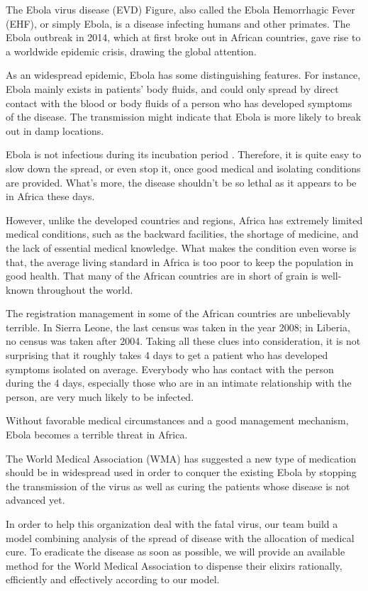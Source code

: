\documentclass[12pt]{article}
\begin{document}
The Ebola virus disease (EVD) Figure, also called the Ebola Hemorrhagic Fever (EHF), or simply Ebola, is a disease infecting humans and other primates. The Ebola outbreak in 2014, which at first broke out in African countries, gave rise to a worldwide epidemic crisis, drawing the global attention.

As an widespread epidemic, Ebola has some distinguishing features. For instance, Ebola mainly exists in patients' body fluids, and could only spread by direct contact with the blood or body fluids of a person who has developed symptoms of the disease. The transmission might indicate that Ebola is more likely to break out in damp locations. 

Ebola is not infectious during its incubation period \cite{pmid25373801, Transmission, pmid25347231}. 
Therefore, it is quite easy to slow down the spread, or even stop it, once good medical and isolating conditions are provided. What's more, the disease shouldn't be so lethal as it appears to be in Africa these days.

However, unlike the developed countries and regions, Africa has extremely limited medical conditions, such as the backward facilities, the shortage of medicine, and the lack of essential medical knowledge. What makes the condition even worse is that, the average living standard in Africa is too poor to keep the population in good health. That many of the African countries are in short of grain is well-known throughout the world.

The registration management in some of the African countries are unbelievably terrible. In Sierra Leone, the last census was taken in the year 2008; in Liberia, no census was taken after 2004. Taking all these clues into consideration, it is not surprising that it roughly takes 4 days \cite{Sitrep} to get a patient who has developed symptoms isolated on average. Everybody who has contact with the person during the 4 days, especially those who are in an intimate relationship with the person, are very much likely to be infected.

Without favorable medical circumstances and a good management mechanism, Ebola becomes a terrible threat in Africa.

The World Medical Association (WMA) has suggested a new type of medication should be in widespread used in order to conquer the existing Ebola by stopping the transmission of the virus as well as curing the patients whose disease is not advanced yet. 

In order to help this organization deal with the fatal virus, our team build a model combining analysis of the spread of disease with the allocation of medical cure. To eradicate the disease as soon as possible, we will provide an available method for the World Medical Association to dispense their elixirs rationally, efficiently and effectively according to our model.
\end{document}
